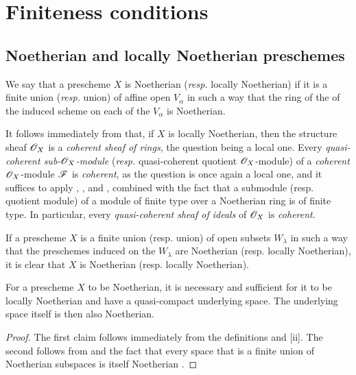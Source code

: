 \section{Finiteness conditions}
\label{section-finiteness-conditions}

\subsection{Noetherian and locally Noetherian preschemes}
\label{subsection-noetherian-and-locally-noetherian-preschemes}

\begin{defn}[6.1.1]
\label{1.6.1.1}
We say that a prescheme $X$ is Noetherian (\emph{resp.} locally Noetherian) if it is a finite union (\emph{resp.} union) of affine open $V_\alpha$ in such a way that the ring of the of the induced scheme on each of the $V_\alpha$ is Noetherian.
\end{defn}

It follows immediately from  that, if $X$ is locally Noetherian, then the structure sheaf $\mathscr{O}_X$ is a \emph{coherent sheaf of rings}, the question being a local one.
Every \emph{quasi-coherent sub-$\mathscr{O}_X$-module}
(\emph{resp.} quasi-coherent quotient $\mathscr{O}_X$-module) of a \emph{coherent} $\mathscr{O}_X$-module $\mathscr{F}$ is \emph{coherent}, as the question is once again a local one, and it suffices to apply , , and , combined with the fact that a submodule (resp. quotient module) of a module of finite type over a Noetherian ring is of finite type.
In particular, every \emph{quasi-coherent sheaf of ideals} of $\mathscr{O}_X$ is \emph{coherent}.

If a prescheme $X$ is a finite union (resp. union) of open subsets $W_\lambda$ in such a way that the preschemes induced on the $W_\lambda$ are Noetherian (resp. locally Noetherian), it is clear that $X$ is Noetherian (resp. locally Noetherian).

\begin{prop}[6.1.2]
\label{1.6.1.2}
For a prescheme $X$ to be Noetherian, it is necessary and sufficient for it to be locally Noetherian and have a quasi-compact underlying space.
The underlying space itself is then also Noetherian.
\end{prop}

\begin{proof}
\label{proof-1.6.1.2}
The first claim follows immediately from the definitions and [ii].
The second follows from  and the fact that every space that is a finite union of Noetherian subspaces is itself Noetherian .
\end{proof}

